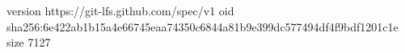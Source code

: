 version https://git-lfs.github.com/spec/v1
oid sha256:6e422ab1b15a4e66745eaa74350c6844a81b9e399dc577494df4f9bdf1201c1e
size 7127
